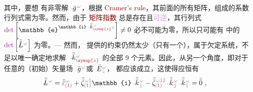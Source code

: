 其中，要想  有非零解 $\xint{{}^{}_{\mathcolor{gray}{-}}}{10}{\bar{g}}^{\;\!\mathcolor{gray}{\omega}}$，根据 \textcolor{Maroon}{Cramer's rule}，其前面的所有矩阵，组成的系数行列式需为零。然而，由于 \textcolor{Maroon}{矩阵指数} 总是存在且\textcolor{Plum}{可逆}，其行列式 $\textcolor{Plum}{\det} \left[ \mathbb{e}^{\mathbb{i} \xint{\begin{smallmatrix} ~ \\ {}^{}_{\mathcolor{gray}{-}} \\ ~ \end{smallmatrix}}{15}{\bar{\bar{k}}}_{\textcolor{Maroon}{\symup{z}}}^{\;\! \mathcolor{gray}{\omega}} \mathcolor{gray}{z}} \right] \neq 0$ 必不可能为零，所以只可能有  中的 $\textcolor{Plum}{\det} \left[ \xint{\mathcolor{gray}{-}}{30}{\bar{\bar{L}}}^{\;\! \mathcolor{gray}{\omega}} \right]$ 为零。--- 然而， 提供的约束仍然太少（只有一个），属于欠定系统，不足以唯一确定地求解 $\xint{\begin{smallmatrix} ~ \\ {}^{}_{\mathcolor{gray}{-}} \\ ~ \end{smallmatrix}}{15}{\bar{\bar{k}}}_{\textcolor{Maroon}{\symup{z}}}^{\;\! \mathcolor{gray}{\omega}}$ 的全部 9 个元素。因此，从另一个角度，即对于任意的（初始）矢量场 $\xint{{}^{}_{\mathcolor{gray}{-}}}{10}{\bar{g}}^{\;\!\mathcolor{gray}{\omega}}$或 $\xint{\mathcolor{gray}{-}}{25}{\bar{E}}^{\;\!\mathcolor{gray}{\omega}}_{\;\! \mathcolor{gray}{z}}$， 都应该成立\cite{sturmElectromagneticWavesCrystals2024}，这使得应恒有
\begin{align} \label{eq:nonlinear(2)-wave_wkrho-simplify6-L4}
	\xint{\mathcolor{gray}{-}}{32}{\bar{\bar{L}}}^{\;\! \mathcolor{gray}{\omega}}
	= \bar{\bar{\varepsilon}}^{\;\! \mathcolor{gray}{\omega}}_{\textcolor{Maroon}{(1)}} + \bar{\bar{\zeta}}^{\;\! \mathcolor{gray}{\omega} \mathcolor{gray}{\check{1}}}_{\textcolor{Maroon}{(1)}} \mathbb{i} \xint{\begin{smallmatrix} ~ \\ {}^{}_{\mathcolor{gray}{-}} \\ ~ \end{smallmatrix}}{15}{\bar{\bar{k}}}_{\;\! \mathcolor{gray}{\check{1}}}^{\;\! \mathcolor{gray}{\omega}} - \bar{\bar{\zeta}}^{\;\! \mathcolor{gray}{\omega} \mathcolor{gray}{\check{1} \check{2}}}_{\textcolor{Maroon}{(1)}} \xint{\begin{smallmatrix} ~ \\ {}^{}_{\mathcolor{gray}{-}} \\ ~ \end{smallmatrix}}{15}{\bar{\bar{k}}}_{\;\! \mathcolor{gray}{\check{2}}}^{\;\! \mathcolor{gray}{\omega}} \xint{\begin{smallmatrix} ~ \\ {}^{}_{\mathcolor{gray}{-}} \\ ~ \end{smallmatrix}}{15}{\bar{\bar{k}}}_{\;\! \mathcolor{gray}{\check{1}}}^{\;\! \mathcolor{gray}{\omega}} &= \bar{\bar{0}}~,
\end{align}
